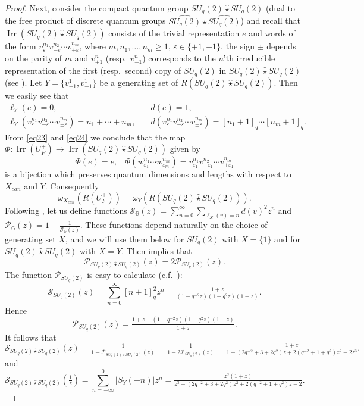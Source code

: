 \documentclass[11 pt, leqno]{amsart}
\newcommand{\eps}{\varepsilon}
\newcommand{\mc}{\mathcal}
\newcommand{\GG}{\mathbb{G}}
\newcommand{\wh}{\widehat}
\DeclareMathOperator{\Irr}{Irr}
\theoremstyle{definition}
\numberwithin{equation}{section}
\begin{document}
\begin{proof}
Next, consider the compact quantum group $SU_q(2)\wh{\star} SU_q(2)$ (dual to the free product of discrete quantum groups $\wh{SU_q(2)}\star \wh{SU_q(2)}$) and recall that $\Irr(SU_q(2)\wh{\star}SU_q(2))$ consists of the trivial representation $e$ and words of the form $v^{n_1}_{\eps} v^{n_2}_{-\eps}\cdots v^{n_m}_{\pm \eps}$, where $m,n_1,\dotsc,n_m\ge 1$, $\eps\in \{+1,-1\}$, the sign $\pm$ depends on the parity of $m$ and $v_{+1}^n$ (resp.~$v_{-1}^n$) corresponds to the $n$'th irreducible representation of the first (resp.~second) copy of $SU_q(2)$ in $SU_q(2)\wh{\star}SU_q(2)$ (see \cite{Wangfree}). Let $Y=\{v^1_{+1},v^1_{-1}\}$ be a generating set of $R(SU_q(2)\wh{\star}SU_q(2))$. Then we easily see that
\begin{equation}\label{eq24}
\begin{split}
\ell_{Y}(e)=0,&\quad d(e)=1,\\
\ell_{Y}(v^{n_1}_{\eps} v^{n_2}_{-\eps}\cdots v^{n_m}_{\pm \eps}) =n_1+\cdots+n_m,&\quad 
d(v^{n_1}_{\eps} v^{n_2}_{-\eps}\cdots v^{n_m}_{\pm \eps}) =
[n_1+1]_q\cdots [n_m+1]_q.
\end{split}\end{equation}
From \eqref{eq23} and \eqref{eq24} we conclude that the map $\Phi\colon \Irr(U_F^+)\rightarrow \Irr(SU_q(2)\wh{\star}SU_q(2))$ given by 
\begin{equation}\label{eq25}
\Phi(e) =e, \;\;\;
\Phi(w^{n_1}_{\eps_1}\cdots w^{n_m}_{\eps_m})=
v^{n_1}_{\eps_1} v^{n_2}_{-\eps_1}\cdots v^{n_m}_{\pm \eps_1}
\end{equation}
is a bijection which preserves quantum dimensions and lengths with respect to $X_{can}$ and $Y$. Consequently
\[
\omega_{X_{can}}(R(U_F^+))=
\omega_Y(R(SU_q(2)\wh{\star}SU_q(2) )).
\]
Following \cite{BanicaVergnioux}, let us define functions $\mc{S}_{\GG}(z)=\sum_{n=0}^{\infty} 
\sum_{\ell_X(v)=n} d(v)^2 z^n$ and $\mc{P}_{\GG}(z)=1-\tfrac{1}{\mc{S}_{\GG}(z)}$. These functions depend naturally on the choice of generating set $X$, and we will use them below for $SU_q(2)$ with $X=\{1\}$ and for $SU_q(2)\wh{\star}SU_q(2)$ with $X=Y$. Then  \cite[Theorem 3.2]{BanicaVergnioux} implies that
\[
\mc{P}_{SU_q(2)\wh{\star}SU_q(2)}(z)=2 \mc{P}_{SU_q(2)}(z).
\]
The function $\mc{P}_{SU_q(2)}$ is easy to calculate (c.f.~\cite[Theorem 4.1]{BanicaVergnioux}):
\[
\mc{S}_{SU_q(2)}(z)=\sum_{n=0}^{\infty} [n+1]_q^2 z^n=
\tfrac{1+z}{(1-q^{-2}z )(1-q^2 z) (1-z)}.
\]
Hence
\[
\mc{P}_{SU_q(2)}(z)=
\tfrac{1+z -(1-q^{-2}z)(1-q^2 z)(1-z) }{1+z}.
\]
It follows that
\[
\mc{S}_{SU_q(2)\wh{\star}SU_q(2)}(z)=
\tfrac{1}{1-\mc{P}_{SU_q(2)\wh{\star}SU_q(2)}(z)}=
\tfrac{1}{1-2 \mc{P}_{SU_q(2)}(z)}=\tfrac{1+z}{
1- (2q^{-2} +3+2q^2)z +2(q^{-2}+1+q^2)z^2 -2z^3}.
\]
and
\begin{equation}\label{eq26}
\mc{S}_{SU_q(2)\wh{\star}SU_q(2)}(\tfrac{1}{z})=
\sum_{n=-\infty}^{0}
|S_Y(-n)| z^n=
\tfrac{z^2(1+z)}{
z^3- (2q^{-2} +3+2q^2)z^2 +2(q^{-2}+1+q^2)z -2}.
\end{equation}


\end{proof}
\end{document}

